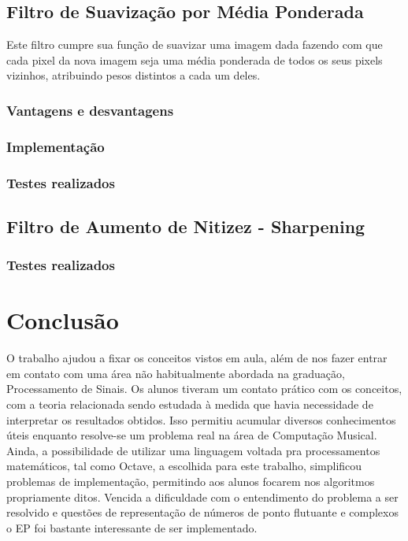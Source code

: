 \documentclass[brazil,times]{abnt}
\begin{document}
	
	\section{Filtro de Suavização por Média Ponderada}
		Este filtro cumpre sua função de suavizar uma imagem dada fazendo com que cada pixel da nova imagem seja uma média ponderada de todos os seus pixels vizinhos, atribuindo pesos distintos a cada um deles. 
	
		\subsection{Vantagens e desvantagens}
		
		\subsection{Implementação}
		
		\subsection{Testes realizados}

	\section{Filtro de Aumento de Nitizez - Sharpening}

		\subsection{Testes realizados}


\chapter{Conclusão}
	O trabalho ajudou a fixar os conceitos vistos em aula, além de nos fazer entrar em contato com uma área não habitualmente abordada na graduação, Processamento de Sinais. Os alunos tiveram um contato prático com os conceitos, com a teoria relacionada sendo estudada à medida que havia necessidade de interpretar os resultados obtidos. Isso permitiu acumular diversos conhecimentos úteis enquanto resolve-se um problema real na área de Computação Musical. Ainda, a possibilidade de utilizar uma linguagem voltada pra processamentos matemáticos, tal como Octave, a escolhida para este trabalho, simplificou problemas de implementação, permitindo aos alunos focarem nos algoritmos propriamente ditos. Vencida a dificuldade com o entendimento do problema a ser resolvido e questões de representação de números de ponto flutuante e complexos o EP foi bastante interessante de ser implementado.
	
\nocite{*}


\end{document}
